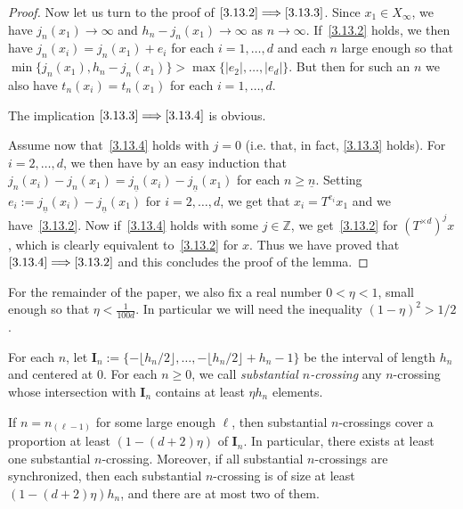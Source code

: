 \documentclass[AHL,Unicode,longabstracts]{cedram}
\newcommand{\egdef}{:=}
\newcommand{\ZZ}{\mathbb{Z}}
\newcommand{\td}{T^{\times d}}
\newcommand{\nb}{\underline{n}}
\newcommand{\ci}{\boldsymbol I}
\begin{document}
\begin{proof}
Now let us turn to the proof of $\eqref{3.13.2}\Longrightarrow\eqref{3.13.3}$. Since $x_1\in X_\infty$, we have $j_n(x_1)\to \infty$ and $h_n-j_n(x_1)\to \infty$ as $n\to\infty$. If~\eqref{3.13.2} holds, we then have $j_n(x_i)=j_n(x_1)+e_i$ for each $i=1,\dots,d$ and each $n$ large enough so that $\min\{j_n(x_1),h_n-j_n(x_1)\}>\max\{|e_2|,\ldots,|e_d|\}$. But then for such an $n$ we also have $t_n(x_i)=t_n(x_1)$ for each $i=1,\ldots,d$.

The implication $\eqref{3.13.3}\Longrightarrow\eqref{3.13.4}$ is obvious.

Assume now that~\eqref{3.13.4} holds with $j=0$ (i.e. that, in fact, \eqref{3.13.3} holds). For $i=2,\ldots,d$, we then have by an easy induction that $j_n(x_i)-j_n(x_1)=j_{\nb}(x_i)-j_{\nb}(x_1)$ for each $n\ge \nb$. Setting $e_i\egdef j_{\nb}(x_i)-j_{\nb}(x_1)$ for $i=2,\ldots,d$, we get that $x_i=T^{e_i}x_1$ and we have~\eqref{3.13.2}. Now if~\eqref{3.13.4} holds with some $j\in\ZZ$, we get~\eqref{3.13.2} for $(\td)^jx$, which is clearly equivalent to~\eqref{3.13.2} for $x$. Thus we have proved that $\eqref{3.13.4}\Longrightarrow\eqref{3.13.2}$ and this concludes the proof of the lemma.
\end{proof}

For the remainder of the paper, we also fix a real number $0<\eta<1$, small enough so that $\eta < \frac{1}{100 d}$. In particular we will need the inequality $(1-\eta)^2>1/2$.

\begin{defi}
For each $n$, let $\ci_n\egdef \{-\lfloor h_n/2\rfloor,\ldots,-\lfloor h_n/2\rfloor+h_n-1\}$ be the interval of length $h_n$ and centered at 0. For each $n\ge0$, we call \emph{substantial $n$-crossing} any $n$-crossing whose intersection with $\ci_n$ contains at least $\eta h_n$ elements.
\end{defi}

\begin{lemm}\label{lemma:substantialncrossings}
If $n=n_{(\ell-1)}$ for some large enough $\ell$, then substantial $n$-crossings cover a proportion at least $(1-(d+2)\eta)$ of $\ci_n$. In particular, there exists at least one substantial $n$-crossing. Moreover, if all substantial $n$-crossings are synchronized, then each substantial $n$-crossing is of size at least $(1-(d+2)\eta) h_n$, and there are at most two of them.
\end{lemm}
\end{document}
